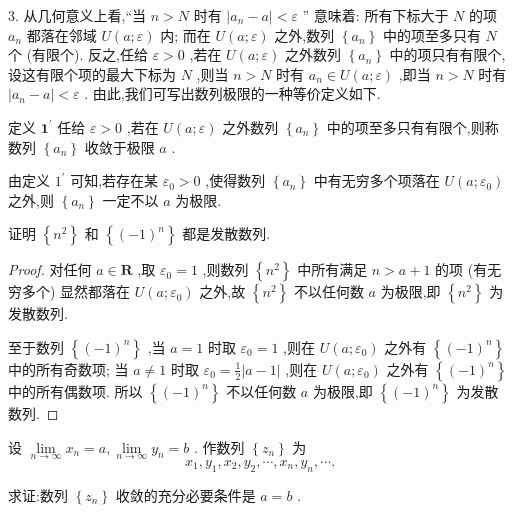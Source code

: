 3. 从几何意义上看,“当 \(n > N\) 时有 \(\left| {{a}_{n} - a}\right|  < \varepsilon\) ” 意味着: 所有下标大于 \(N\) 的项 \({a}_{n}\) 都落在邻域 \(U\left( {a;\varepsilon }\right)\) 内; 而在 \(U\left( {a;\varepsilon }\right)\) 之外,数列 \(\left\{  {a}_{n}\right\}\) 中的项至多只有 \(N\) 个 (有限个). 反之,任给 \(\varepsilon  > 0\) ,若在 \(U\left( {a;\varepsilon }\right)\) 之外数列 \(\left\{  {a}_{n}\right\}\) 中的项只有有限个,设这有限个项的最大下标为 \(N\) ,则当 \(n > N\) 时有 \({a}_{n} \in  U\left( {a;\varepsilon }\right)\) ,即当 \(n > N\) 时有 \(\left| {{a}_{n} - a}\right|  < \varepsilon\) . 由此,我们可写出数列极限的一种等价定义如下.

定义 \({\mathbf{1}}^{\prime }\) 任给 \(\varepsilon  > 0\) ,若在 \(U\left( {a;\varepsilon }\right)\) 之外数列 \(\left\{  {a}_{n}\right\}\) 中的项至多只有有限个,则称数列 \(\left\{  {a}_{n}\right\}\) 收敛于极限 \(a\) .

由定义 \({1}^{\prime }\) 可知,若存在某 \({\varepsilon }_{0} > 0\) ,使得数列 \(\left\{  {a}_{n}\right\}\) 中有无穷多个项落在 \(U\left( {a;{\varepsilon }_{0}}\right)\) 之外,则 \(\left\{  {a}_{n}\right\}\) 一定不以 \(a\) 为极限.

\begin{example}
证明 \(\left\{  {n}^{2}\right\}\) 和 \(\left\{  {\left( -1\right) }^{n}\right\}\) 都是发散数列.
\end{example}


\begin{proof}
对任何 \(a \in  \mathbf{R}\) ,取 \({\varepsilon }_{0} = 1\) ,则数列 \(\left\{  {n}^{2}\right\}\) 中所有满足 \(n > a + 1\) 的项 (有无穷多个) 显然都落在 \(U\left( {a;{\varepsilon }_{0}}\right)\) 之外,故 \(\left\{  {n}^{2}\right\}\) 不以任何数 \(a\) 为极限,即 \(\left\{  {n}^{2}\right\}\) 为发散数列.

至于数列 \(\left\{  {\left( -1\right) }^{n}\right\}\) ,当 \(a = 1\) 时取 \({\varepsilon }_{0} = 1\) ,则在 \(U\left( {a;{\varepsilon }_{0}}\right)\) 之外有 \(\left\{  {\left( -1\right) }^{n}\right\}\) 中的所有奇数项; 当 \(a \neq  1\) 时取 \({\varepsilon }_{0} = \frac{1}{2}\left| {a - 1}\right|\) ,则在 \(U\left( {a;{\varepsilon }_{0}}\right)\) 之外有 \(\left\{  {\left( -1\right) }^{n}\right\}\) 中的所有偶数项. 所以 \(\left\{  {\left( -1\right) }^{n}\right\}\) 不以任何数 \(a\) 为极限,即 \(\left\{  {\left( -1\right) }^{n}\right\}\) 为发散数列.
\end{proof}

\begin{example}
设 \(\mathop{\lim }\limits_{{n \rightarrow  \infty }}{x}_{n} = a,\mathop{\lim }\limits_{{n \rightarrow  \infty }}{y}_{n} = b\) . 作数列 \(\left\{  {z}_{n}\right\}\) 为
\[
{x}_{1},{y}_{1},{x}_{2},{y}_{2},\cdots ,{x}_{n},{y}_{n},\cdots .
\]

求证:数列 \(\left\{  {z}_{n}\right\}\) 收敛的充分必要条件是 \(a = b\) .
\end{example}



